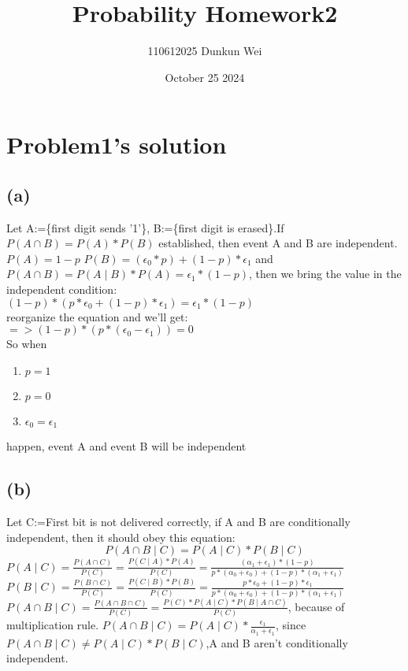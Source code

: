 \documentclass[a4paper,11pt]{article} %
\title{Probability Homework2}
\author{110612025 Dunkun Wei}
\date{October 25 2024}
\begin{document}
\maketitle

\section{Problem1's solution}
\subsection{(a)}
Let A:=\{first digit sends '1'\}, B:=\{first digit is erased\}.If $P(A \cap B) = P(A)*P(B)$ established, then event A and B are independent. $P(A)=1-p$ $P(B)=(\epsilon_0*p)+(1-p)*\epsilon_1$ and $P(A \cap B) = P(A \mid B)*P(A) = \epsilon_1 * (1-p)$, then we bring the value in the independent condition:\\
$(1-p)*(p*\epsilon_0+(1-p)*\epsilon_1) = \epsilon_1*(1-p)$\\reorganize the equation and we'll get:\\
$=>(1-p)*(p*(\epsilon_0-\epsilon_1))=0$\\
So when 
\begin{enumerate}
    \item $p=1$
    \item $p=0$
    \item $\epsilon_0 = \epsilon_1$
\end{enumerate}
happen, event A and event B will be independent

\subsection{(b)}
Let C:={First bit is not delivered correctly}, if A and B are conditionally independent, then it should obey this equation:
\begin{equation*}
P(A \cap B \mid C) = P(A \mid C)*P(B \mid C)
\end{equation*}
$P(A \mid C) = \frac{P(A \cap C)}{P(C)}=\frac{P(C \mid A)*P(A)}{P(C)} = \frac{(\alpha_1+\epsilon_1)*(1-p)}{p*(\alpha_0+\epsilon_0)+(1-p)*(\alpha_1+\epsilon_1)}$\\
$P(B \mid C) = \frac{P(B \cap C)}{P(C)} = \frac{P(C \mid B)*P(B)}{P(C)} = \frac{p*\epsilon_0+ (1-p)*\epsilon_1}{p*(\alpha_0+\epsilon_0)+(1-p)*(\alpha_1+\epsilon_1)}$\\
$P(A \cap B \mid C) = \frac{P(A \cap B \cap C)}{P(C)}=\frac{P(C)*P(A \mid C)*P(B \mid A \cap C)}{P(C)}$, because of multiplication rule.
$P(A \cap B \mid C) = P(A \mid C)*\frac{\epsilon_1}{\alpha_1 + \epsilon_1}$, since $P(A \cap B \mid C) \neq P(A \mid C)*P(B \mid C)$,A and B aren't conditionally independent.
\end{document}
